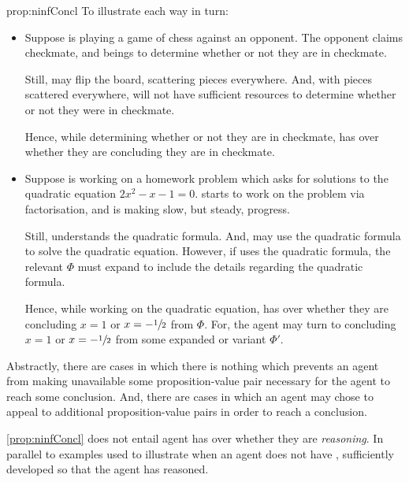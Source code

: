 \begin{note}
\begin{argument}{prop:ninfConcl}
    To illustrate each way in turn:

    \begin{itemize}
    \item
      Suppose \vAgent{} is playing a game of chess against an opponent.
      The opponent claims checkmate, and \vAgent{} beings to determine whether or not they are in checkmate.

      Still, \vAgent{} may flip the board, scattering pieces everywhere.
      And, with pieces scattered everywhere, \vAgent{} will not have sufficient resources to determine whether or not they were in checkmate.

      Hence, while determining whether or not they are in checkmate, \vAgent{} has \ninf{} over whether they are concluding they are in checkmate.
    \end{itemize}

    \begin{itemize}
    \item
      Suppose \vAgent{} is working on a homework problem which asks for solutions to the quadratic equation \(2x^{2} - x - 1 = 0\).
      \vAgent{} starts to work on the problem via factorisation, and is making slow, but steady, progress.

      Still, \vAgent{} understands the quadratic formula.
      And, \vAgent{} may use the quadratic formula to solve the quadratic equation.
      However, if \vAgent{} uses the quadratic formula, the relevant \pool{} \(\Phi\) must expand to include the details regarding the quadratic formula.

      Hence, while working on the quadratic equation, \vAgent{} has \ninf{} over whether they are concluding \(x = 1\) or \(x = -\sfrac{1}{2}\) from \(\Phi\).
      For, the agent may turn to concluding \(x = 1\) or \(x = -\sfrac{1}{2}\) from some expanded or variant \pool{} \(\Phi'\).
    \end{itemize}
  \end{argument}

  Abstractly, there are cases in which there is nothing which prevents an agent from making unavailable some proposition-value pair necessary for the agent to reach some conclusion.
  And, there are cases in which an agent may chose to appeal to additional proposition-value pairs in order to reach a conclusion.
\end{note}

\begin{note}
  \autoref{prop:ninfConcl} does not entail agent has \ninf{} over whether they are \emph{reasoning}.
  In parallel to examples used to illustrate when an agent does not have \ninf{}, sufficiently developed so that the agent has reasoned.
\end{note}


